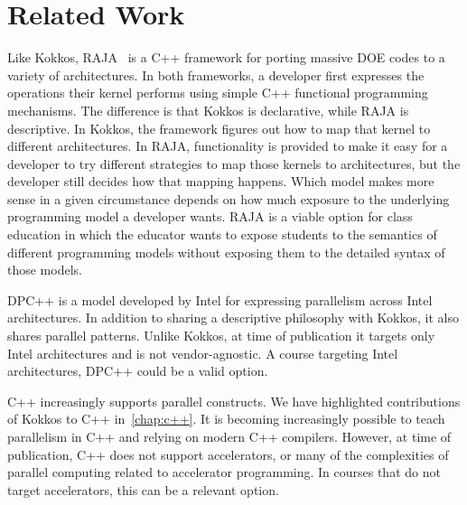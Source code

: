 \section{Related Work}\label{chap:related}
Like Kokkos, RAJA~\cite{RAJA} is a C++ framework for porting massive DOE codes to a variety of architectures. In both frameworks, a developer first expresses the operations their kernel performs using simple C++ functional programming mechanisms. The difference is that Kokkos is declarative, while RAJA is descriptive. In Kokkos, the framework figures out how to map that kernel to different architectures. In RAJA, functionality is provided to make it easy for a developer to try different strategies to map those kernels to architectures, but the developer still decides how that mapping happens. Which model makes more sense in a given circumstance depends on how much exposure to the underlying programming model a developer wants. RAJA is a viable option for class education in which the educator wants to expose students to the semantics of different programming models without exposing them to the detailed syntax of those models.

DPC++\cite{DPCPP} is a model developed by Intel\textsuperscript{\textregistered} for expressing parallelism across Intel architectures. In addition to sharing a descriptive philosophy with Kokkos, it also shares parallel patterns. Unlike Kokkos, at time of publication it targets only Intel architectures and is not vendor-agnostic. A course targeting Intel architectures, DPC++ could be a valid option.

C++ increasingly supports parallel constructs\cite{CPP}. We have highlighted contributions of Kokkos to C++ in~\ref{chap:c++}. It is becoming increasingly possible to teach parallelism in C++ and relying on modern C++ compilers. However, at time of publication, C++ does not support accelerators, or many of the complexities of parallel computing related to accelerator programming. In courses that do not target accelerators, this can be a relevant option.
 
